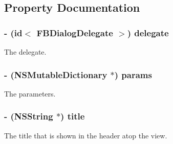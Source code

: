 \subsection{\-Property \-Documentation}
\hypertarget{interface_f_b_dialog_a158079f95fccddae603fd2c01a230e38}{
\subsubsection[{delegate}]{\setlength{\rightskip}{0pt plus 5cm}-\/ (id$<$ {\bf \-F\-B\-Dialog\-Delegate} $>$) delegate}}
\label{interface_f_b_dialog_a158079f95fccddae603fd2c01a230e38}
\-The delegate. \hypertarget{interface_f_b_dialog_a19b9b51024f653d44d8ac39b0f343046}{
\subsubsection[{params}]{\setlength{\rightskip}{0pt plus 5cm}-\/ (\-N\-S\-Mutable\-Dictionary $\ast$) params}}
\label{interface_f_b_dialog_a19b9b51024f653d44d8ac39b0f343046}
\-The parameters. \hypertarget{interface_f_b_dialog_a5c82d4089f7f4171063deff8ced7e34c}{
\subsubsection[{title}]{\setlength{\rightskip}{0pt plus 5cm}-\/ ({\bf \-N\-S\-String} $\ast$) title}}
\label{interface_f_b_dialog_a5c82d4089f7f4171063deff8ced7e34c}
\-The title that is shown in the header atop the view. 

